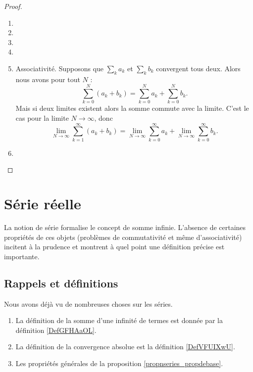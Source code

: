 \begin{proof}
    
    \begin{enumerate}
        \item
            
  \item
  \item 
  \item
\item 
Associativité. Supposons que \( \sum_ka_k\) et \( \sum_kb_k\) convergent tous deux. Alors nous avons pour tout \( N\) :
\begin{equation}
    \sum_{k=0}^N(a_k+b_k)=\sum_{k=0}^Na_k+\sum_{k=0}^Nb_k.
\end{equation}
Mais si deux limites existent alors la somme commute avec la limite. C'est le cas pour la limite \( N\to \infty\), donc
\begin{equation}
    \lim_{N\to \infty} \sum_{k=1}^{\infty}(a_k+b_k)=\lim_{N\to \infty} \sum_{k=0}^{\infty}a_k+\lim_{N\to \infty} \sum_{k=0}^{\infty}b_k.
\end{equation}
\item
    \end{enumerate}
\end{proof}

\section{Série réelle}
\label{secseries}

La notion de série formalise le concept de somme infinie. L'absence de certaines propriétés de ces objets (problèmes de commutativité et même d'associativité) incitent à la prudence et montrent à quel point une définition précise est importante. 

\subsection{Rappels et définitions}

Nous avons déjà vu de nombreuses choses sur les séries.
\begin{enumerate}
    \item
        La définition de la somme d'une infinité de termes est donnée par la définition \ref{DefGFHAaOL}.
    \item
        La définition de la convergence absolue est la définition \ref{DefVFUIXwU}.
    \item
        Les propriétés générales de la proposition \ref{propnseries_propdebase}.
\end{enumerate}

